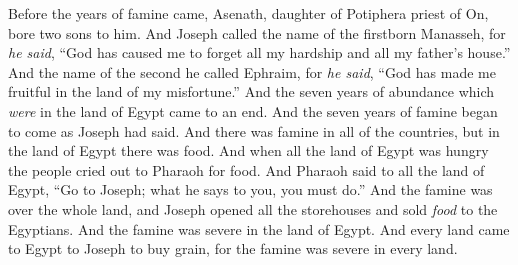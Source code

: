 \begin{biblechapter}
\verse Before the years of famine came, Asenath, daughter of Potiphera priest of On, bore two sons to him.
\verse And Joseph called the name of the firstborn Manasseh, for \textit{he said}, “God has caused me to forget all my hardship and all my father’s house.”
\verse And the name of the second he called Ephraim, for \textit{he said}, “God has made me fruitful in the land of my misfortune.”
\verse And the seven years of abundance which \textit{were} in the land of Egypt came to an end.
\verse And the seven years of famine began to come as Joseph had said. And there was famine in all of the countries, but in the land of Egypt there was food.
\verse And when all the land of Egypt was hungry the people cried out to Pharaoh for food. And Pharaoh said to all the land of Egypt, “Go to Joseph; what he says to you, you must do.”
\verse And the famine was over the whole land, and Joseph opened all the storehouses and sold \textit{food} to the Egyptians. And the famine was severe in the land of Egypt.
\verse And every land came to Egypt to Joseph to buy grain, for the famine was severe in every land.
\end{biblechapter}

